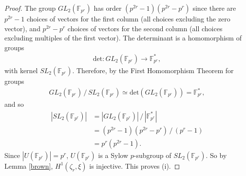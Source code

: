 \begin{proof}
The group $GL_2(\mathbb{F}_{p^r})$ has order $(p^{2r} - 1)(p^{2r} - p^r)$ since there are $p^{2r} - 1$ choices of vectors for the first column (all choices excluding the zero vector), and $p^{2r} - p^r$ choices of vectors for the second column (all choices excluding multiples of the first vector). The determinant is a homomorphism of groups
	\begin{align}
		\mathrm{det}:GL_2(\mathbb{F}_{p^r}) \rightarrow \mathbb{F}^*_{p^r},
	\end{align}
	with kernel $SL_2(\mathbb{F}_{p^r})$. Therefore, by the First Homomorphism Theorem for groups
	\begin{align}
		GL_2(\mathbb{F}_{p^r})\,/\,SL_2(\mathbb{F}_{p^r}) \simeq \mathrm{det}(GL_2(\mathbb{F}_{p^r})) = \mathbb{F}^*_{p^r},
	\end{align}
	and so
	\begin{align*}
		|SL_2(\mathbb{F}_{p^r})|
		&=  |GL_2(\mathbb{F}_{p^r})|\,/\,|\mathbb{F}^*_{p^r}|\\
		&=  (p^{2r} - 1)(p^{2r} - p^r)\,/\,(p^r - 1)\\
		&=  p^r(p^{2r} - 1).
	\end{align*}
	Since $|U(\mathbb{F}_{p^r})| = p^r$, $U(\mathbb{F}_{p^r})$ is a Sylow $p$-subgroup of $SL_2(\mathbb{F}_{p^r})$.
So by Lemma \ref{brown}, $H^1(\zeta_r, \xi)$ is injective. This proves (i).
	

\end{proof}
